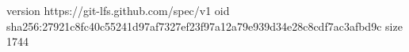 version https://git-lfs.github.com/spec/v1
oid sha256:27921c8fc40c55241d97af7327ef23f97a12a79e939d34e28c8cdf7ac3afbd9c
size 1744
